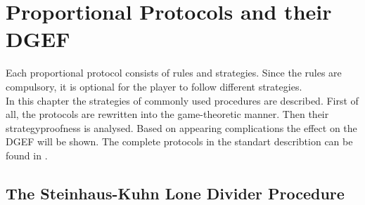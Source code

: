 \section{Proportional Protocols and their DGEF}
Each proportional protocol consists of rules and strategies. Since the rules are compulsory, it is optional for the player to follow different strategies.\\
In this chapter the strategies of commonly used procedures are described. First of all, the protocols are rewritten into the game-theoretic manner. Then their strategyproofness is analysed. Based on appearing complications the effect on the DGEF will be shown. The complete protocols in the standart describtion can be found in \cite{robertson:cake-cutting}.
\subsection{The Steinhaus-Kuhn Lone Divider Procedure}
 
